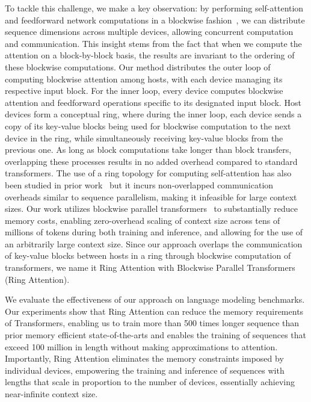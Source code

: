 To tackle this challenge, we make a key observation: by performing self-attention and feedforward network computations in a blockwise fashion~\citep{liu2023blockwise}, we can distribute sequence dimensions across multiple devices, allowing concurrent computation and communication. This insight stems from the fact that when we compute the attention on a block-by-block basis, the results are invariant to the ordering of these blockwise computations. Our method distributes the outer loop of computing blockwise attention among hosts, with each device managing its respective input block. For the inner loop, every device computes blockwise attention and feedforward operations specific to its designated input block. Host devices form a conceptual ring, where during the inner loop, each device sends a copy of its key-value blocks being used for blockwise computation to the next device in the ring, while simultaneously receiving key-value blocks from the previous one. As long as block computations take longer than block transfers, overlapping these processes results in no added overhead compared to standard transformers. The use of a ring topology for computing self-attention has also been studied in prior work~\citep{li2021sequence} but it incurs non-overlapped communication overheads similar to sequence parallelism, making it infeasible for large context sizes. Our work utilizes blockwise parallel transformers~\citep{liu2023blockwise} to substantially reduce memory costs, enabling zero-overhead scaling of context size across tens of millions of tokens during both training and inference, and allowing for the use of an arbitrarily large context size. Since our approach overlaps the communication of key-value blocks between hosts in a ring through blockwise computation of transformers, we name it Ring Attention with Blockwise Parallel Transformers ({Ring Attention}).

We evaluate the effectiveness of our approach on language modeling benchmarks. Our experiments show that {Ring Attention} can reduce the memory requirements of Transformers, enabling us to train more than 500 times longer sequence than prior memory efficient state-of-the-arts and enables the training of sequences that exceed 100 million in length without making approximations to attention. Importantly, {Ring Attention} eliminates the memory constraints imposed by individual devices, empowering the training and inference of sequences with lengths that scale in proportion to the number of devices, essentially achieving near-infinite context size.

